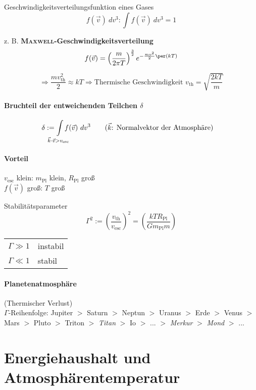 Geschwindigkeitsverteilungsfunktion eines Gases
\[ f(\vec v)\ dv^3: \int f (\vec v)\ dv^3 = 1 \tag{Normierung} \]

z. B. \textbf{\textsc{Maxwell}-Geschwindigkeitsverteilung}
\[ f(\vec v) = \left(\frac{m}{2 \pi T}\right)^{\frac{3}{2}} e^{-\frac{mv^2}{2} \per (k T)} \]

\[ \Rightarrow \frac{m v_{\mathrm{th}}^2}{2} \approx kT \Rightarrow \text{Thermische Geschwindigkeit $v_{\mathrm{th}} = \sqrt{\dfrac{2 k T}{m}}$}\]

\paragraph{Bruchteil der entweichenden Teilchen $\delta$}
\begin{align*}
    \delta &:= \int\limits_{\mathclap{\vec k \cdot \vec v > v_{\mathrm{esc}}}} f(\vec v)\ dv^3 \tag{$\vec k$: Normalvektor der Atmosphäre}
\end{align*}

\paragraph{Vorteil} $v_{\mathrm{esc}}$ klein: $m_{\mathrm{Pl}}$ klein, $R_{\mathrm{Pl}}$ groß \\
    $f(\vec v)$ groß: $T$ groß

\begin{definition}
    Stabilitätsparameter
    \[ \Gamma^2 := \left(\frac{v_{\mathrm{th}}}{v_{\mathrm{esc}}}\right)^2 = \left(\frac{kTR_{\mathrm{Pl}}}{G m_{\mathrm{Pl}} m}\right) \]
    \begin{tabular}{r@{:\ }l}
        $\Gamma \gg 1$ & instabil \\
        $\Gamma \ll 1$ & stabil
    \end{tabular}
\end{definition}

\paragraph{Planetenatmosphäre} (Thermischer Verlust) \\
$\Gamma$-Reihenfolge: Jupiter $>$ Saturn $>$ Neptun $>$ Uranus $>$ Erde $>$
Venus $>$ Mars $>$ Pluto $>$ Triton $>$ \emph{Titan} $>$ Io $>$ ... $>$ \emph{Merkur}
$>$ \emph{Mond} $>$ ...

\section{Energiehaushalt und Atmosphärentemperatur}

